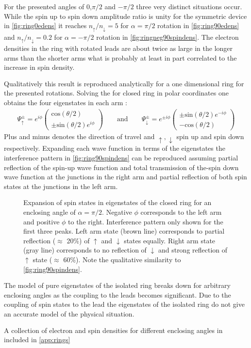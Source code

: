For the presented angles of 0,$\pi/2$ and $-\pi/2$ three very distinct situations occur. While the spin up to spin down amplitude ratio is unity for the symmetric device in \cref{fig:ring0edens} it reaches $n_{\uparrow}/n_{\downarrow}=5$ for $\alpha=\pi/2$ rotation in \cref{fig:ring90edens} and $n_{\uparrow}/n_{\downarrow}=0.2$ for $\alpha=-\pi/2$ rotation in \cref{fig:ringneg90spindens}. The electron densities in the ring with rotated leads are about twice as large in the longer arms than the shorter arms what is probably at least in part correlated to the increase in spin density.\par
Qualitatively this result is reproduced analytically for a one dimensional ring for the presented rotations. Solving the \hamil{} for closed ring in polar coordinates one obtains the four eigenstates in each arm \cite{nitta1999.695}:
\begin{align}
\Psi^{\pm}_{\uparrow} = e^{i\phi}\begin{pmatrix}\text{cos}(\theta/2)\\\pm\text{sin}(\theta/2)e^{i\phi}\end{pmatrix} 
\qquad\text{and}\qquad
\Psi^{\pm}_{\downarrow} = e^{\pm i\phi}\begin{pmatrix}\pm\text{sin}(\theta/2)e^{-i\phi}\\-\text{cos}(\theta/2)\end{pmatrix}
\end{align}
Plus and minus denotes the direction of travel and $\uparrow,\downarrow$ spin up and spin down respectively. Expanding each wave function in terms of the eigenstates the interference pattern in \cref{fig:ring90spindens} can be reproduced assuming partial reflection of the spin-up wave function and total transmission of the-spin down wave function at the junctions in the right arm and partial reflection of both spin states at the junctions in the left arm.
\begin{figure}[!h]
\centering
{}
\caption{Expansion of spin states in eigenstates of the closed ring for an enclosing angle of $\alpha = \pi/2$. Negative $\phi$ corresponds to the left arm and positive $\phi$ to the right. Interference pattern only shown for the first three peaks. Left arm state (brown line) corresponds to partial reflection ($\approx$ 20\%) of $\uparrow$ and $\downarrow$ states equally. Right arm state (gray line) corresponds to no reflection of $\downarrow$ and strong reflection of $\uparrow$ state ($\approx$ 60\%). Note the qualitative similarity to \cref{fig:ring90spindens}.}
\end{figure}
The model of pure eigenstates of the isolated ring breaks down for arbitrary enclosing angles as the coupling to the leads becomes significant. Due to the coupling of spin states to the lead the eigenstates of the isolated ring do not give an accurate model of the physical situation.\par
A collection of electron and spin densities for different enclosing angles in included in \cref{app:rings}
